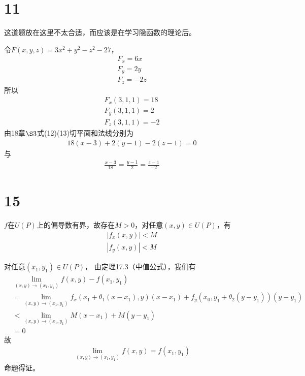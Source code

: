 \documentclass{article}
\begin{document}
\section*{11}

这道题放在这里不太合适，而应该是在学习隐函数的理论后。

令$F(x, y, z) = 3x^2 + y^2 - z^2 - 27$，
\begin{align}
  F_x = 6x \\
  F_y = 2y \\
  F_z = -2 z
\end{align}
所以
\begin{align}
  F_x(3, 1, 1) = 18 \\
  F_y(3, 1, 1) = 2  \\
  F_z(3, 1, 1) = -2
\end{align}
由18章$\S 3$式(12)(13)切平面和法线分别为
\begin{align}
  18 (x - 3) + 2(y - 1) - 2(z - 1) = 0
\end{align}
与
\begin{align}
  \frac{x - 3}{18} = \frac{y - 1}{2} = \frac{z - 1}{-2}
\end{align}



\section*{15}

$f$在$U(P)$上的偏导数有界，故存在$M > 0$，对任意$(x, y) \in U(P)$，有
\begin{align*}
  |f_x(x, y)| < M \\
  |f_y(x, y)| < M
\end{align*}

对任意$(x_1, y_1) \in U(P)$，
由定理17.3（中值公式），我们有
\begin{align*}
   & \lim\limits_{(x, y) \to (x_1, y_1)} f(x, y) - f(x_1, y_1)                                                                   \\
   & = \lim\limits_{(x, y) \to (x_1, y_1)} f_x(x_1 + \theta_1(x - x_1), y)(x - x_1) + f_y(x_0, y_1 + \theta_2(y - y_1))(y - y_1) \\
   & < \lim\limits_{(x, y) \to (x_1, y_1)} M (x - x_1) + M(y - y_1)                                                              \\
   & = 0
\end{align*}
故
\begin{align*}
  \lim\limits_{(x, y) \to (x_1, y_1)} f(x, y) = f(x_1, y_1)
\end{align*}
命题得证。
\end{document}
